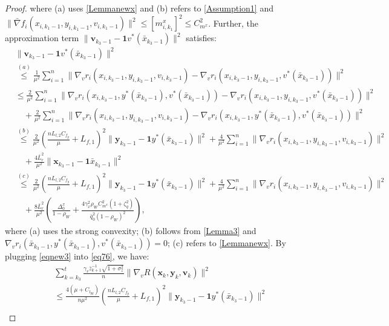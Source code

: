 \documentclass{article}
\theoremstyle{plain}
\theoremstyle{definition}
\theoremstyle{remark}
\begin{document}
\begin{proof}
where (a) uses \cref{Lemmanewx} and (b) refers to \cref{Assumption1} and \(\|\bar{\nabla} f_i({x}_{i,k_1-1}, {y}_{i,k_1-1},{v}_{i,k_1-1})\|^2 \leq [m^x_{i,k_1}]^2 \leq C_{m^x}^2\). Further, the approximation term $\|\mathbf{v}_{k_3-1} - \mathbf{1}v^*(\bar{x}_{k_3-1})\|^2$ satisfies:
\begin{align}
    &\|\mathbf{v}_{k_3-1} - \mathbf{1}v^*(\bar{x}_{k_3-1})\|^2\nonumber\\
    &\overset{(a)}{\leq}\frac{1}{\mu^2}\sum_{i=1}^n \|\nabla_v r_i(x_{i,k_3-1}, y_{i,k_3-1}, v_{i,k_3-1}) - \nabla_v r_i(x_{i,k_3-1}, y_{i,k_3-1}, v^*(\bar{x}_{k_3-1}))\|^2\nonumber\\
     &{\leq}\frac{2}{\mu^2}\sum_{i=1}^n \|\nabla_v r_i(x_{i,k_3-1}, y^*(\bar{x}_{k_3-1}), v^*(\bar{x}_{k_3-1})) - \nabla_v r_i(x_{i,k_3-1}, y_{i,k_3-1}, v^*(\bar{x}_{k_3-1}))\|^2 \nonumber\\
&\quad + \frac{2}{\mu^2}\sum_{i=1}^n \|\nabla_v r_i(x_{i,k_3-1}, y_{i,k_3-1}, v_{i,k_3-1}) - \nabla_v r_i(x_{i,k_3-1}, y^*(\bar{x}_{k_3-1}), v^*(\bar{x}_{k_3-1}))\|^2 \nonumber\\
&\overset{(b)}{\leq}  \frac{2}{\mu^2}\left(\frac{nL_{l,2}C_{f_y}}{\mu}+L_{f,1}\right)^2\!\!\|\mathbf{y}_{k_3-1}\!-\mathbf{1}y^*(\bar{x}_{k_3-1})\|^2 + \frac{4}{\mu^2}\sum_{i=1}^n \|\nabla_v r_i(x_{i,k_3-1}, y_{i,k_3-1}, v_{i,k_3-1})\|^2\nonumber\\
&\quad+ \frac{4\bar{L}_r^2}{\mu^2}\|\mathbf{x}_{k_3-1}-\mathbf{1}\bar{x}_{k_3-1}\|^2\nonumber\\
&\overset{(c)}{\leq} \frac{2}{\mu^2}\left(\frac{nL_{l,2}C_{f_y}}{\mu}+L_{f,1}\right)^2\!\!\|\mathbf{y}_{k_3-1}\!-\mathbf{1}y^*(\bar{x}_{k_3-1})\|^2 + \frac{4}{\mu^2}\sum_{i=1}^n \|\nabla_v r_i(x_{i,k_3-1}, y_{i,k_3-1}, v_{i,k_3-1})\|^2\nonumber\\
&\quad+\frac{8\bar{L}_r^2}{\mu^2}\left(\frac{\Delta_0^x}{1-\rho_W}+  \frac{4 \gamma_x^2 \rho_WC_{m^x}^2 (1 + \zeta_q^2)}{\bar{q}_0^2(1 - \rho_W)^2} \right)
,\label{eqnew3}
\end{align}
where (a) uses the strong convexity; (b) follows from \cref{Lemma3} and $\nabla_v r_i(\bar{x}_{k_3-1}, y^*(\bar{x}_{k_3-1}), v^*(\bar{x}_{k_3-1})) = 0$; (c) refers to \cref{Lemmanewx}. By plugging \cref{eqnew3} into \cref{eq76}, we have:
\begin{align}
&\sum_{k=k_3}^t \frac{\gamma_v\bar{z}_{k+1}^{-1}\sqrt{1+\sigma_z^2}}{n} \|\nabla_v R(\mathbf{x}_k, \mathbf{y}_k, \mathbf{v}_k)\|^2 \nonumber\\
&\leq  \frac{4(\mu + C_{l_{yy}})}{n\mu^2}\left(\frac{nL_{l,2}C_{f_y}}{\mu}+L_{f,1}\right)^2\!\!\|\mathbf{y}_{k_3-1}\!-\mathbf{1}y^*(\bar{x}_{k_3-1})\|^2 \nonumber\\

\end{align}
\end{proof}
\end{document}
